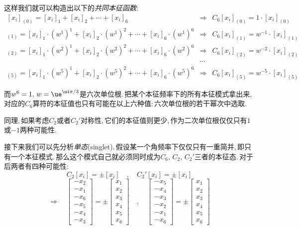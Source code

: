 这样我们就可以构造出以下的\emph{共同本征函数}:
\[
\begin{array}{rcl}
[x_i]_{(0)}=[x_i]_1+[x_i]_2+\cdots+[x_i]_6 & \Rightarrow & C_6[x_i]_{(0)}=1\cdot[x_i]_{(0)}\\

[x_i]_{(1)}=[x_i]_1\cdot (w^1)^1+[x_i]_2\cdot (w^1)^2+\cdots+[x_i]_6\cdot (w^1)^6 & \Rightarrow & C_6[x_i]_{(1)}=w^{-1}\cdot[x_i]_{(1)}\\

[x_i]_{(2)}=[x_i]_1\cdot (w^2)^1+[x_i]_2\cdot (w^2)^2+\cdots+[x_i]_6\cdot (w^2)^6 & \Rightarrow & C_6[x_i]_{(2)}=w^{-2}\cdot[x_i]_{(2)}\\

&\cdots& \\ 

[x_i]_{(5)}=[x_i]_1\cdot (w^5)^1+[x_i]_2\cdot (w^5)^2+\cdots+[x_i]_6\cdot (w^5)^6 & \Rightarrow & C_6[x_i]_{(5)}=w^{-5}\cdot[x_i]_{(5)}
\end{array}
\]

而$w^6=1,\,w=\ue^{\ui\pi/3}$是六次单位根.\,把某个本征频率下的所有本征模式拿出来,\,对应的$C_6$算符的本征值也只有可能在以上六种值:\,六次单位根的若干幂次中选取.

同理,\,如果考虑$C_2$或者$C_2'$对称性,\,它们的本征值则更少,\,作为二次单位根仅仅只有$1$或$-1$两种可能性.\,

接下来我们可以先分析\emph{单态}(singlet).\,假设某一个角频率下仅仅只有一重简并,\,即只有一个本征模式.\,那么这个模式自己就必须同时成为$C_6,\,C_2,\,C_2'$三者的本征态.\,对于后两者有四种可能性:
\[C_2[x_i]=\pm [x_i]\quad ,\quad C_2'[x_i]=\pm [x_i]\]
\[\Rightarrow\quad \begin{bmatrix}-x_2\\-x_1\\-x_6\\-x_5\\-x_4\\-x_3\end{bmatrix} =\pm \begin{bmatrix}x_1\\x_2\\x_3\\x_4\\x_5\\x_6\end{bmatrix}\quad,\quad \begin{bmatrix}-x_5\\-x_4\\-x_3\\-x_2\\-x_1\\-x_6\end{bmatrix} =\pm \begin{bmatrix}x_1\\x_2\\x_3\\x_4\\x_5\\x_6\end{bmatrix}\]



